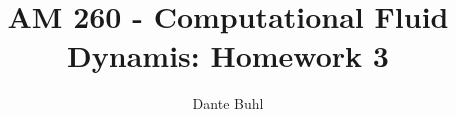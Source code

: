 \documentclass{article}
\begin{document}
\title{AM 260 - Computational Fluid Dynamis: Homework 3}
\author{Dante Buhl}


\newcommand{\wrms}{w_{\text{rms}}}
\newcommand{\bs}[1]{\boldsymbol{#1}}
\newcommand{\tb}[1]{\textbf{#1}}
\newcommand{\bmp}[1]{\begin{minipage}{#1\textwidth}}
\newcommand{\emp}{\end{minipage}}
\newcommand{\R}{\mathbb{R}}
\newcommand{\C}{\mathbb{C}}
\newcommand{\N}{\mathcal{N}}
\newcommand{\m}{\bs{\mu}_*}
\newcommand{\s}{\bs{\Sigma}_*}
\newcommand{\dt}{\Delta t}
\newcommand{\dx}{\Delta x}
\newcommand{\tr}[1]{\text{Tr}(#1)}
\newcommand{\Tr}[1]{\text{Tr}(#1)}
\newcommand{\Div}{\nabla \cdot}
\renewcommand{\div}{\nabla \cdot}
\newcommand{\Curl}{\nabla \times}
\newcommand{\Grad}{\nabla}
\newcommand{\grad}{\nabla}
\newcommand{\grads}{\nabla_s}
\newcommand{\gradf}{\nabla_f}
\newcommand{\xs}{x_s}
\newcommand{\x}{\bs{x}}
\newcommand{\xf}{x_f}
\newcommand{\ts}{t_s}
\newcommand{\tf}{t_f}
\newcommand{\pt}{\partial t}
\newcommand{\pz}{\partial z}
\newcommand{\uvec}{\bs{u}}
\newcommand{\bvec}{\bs{B}}
\newcommand{\nvec}{\hat{\bs{n}}}
\newcommand{\tu}{\tilde{\uvec}}
\newcommand{\B}{\bs{B}}
\newcommand{\A}{\bs{A}}
\newcommand{\jvec}{\bs{j}}
\newcommand{\F}{\bs{F}}
\newcommand{\T}{\tilde{T}}
\newcommand{\ez}{\bs{e}_z}
\newcommand{\ex}{\bs{e}_x}
\newcommand{\ey}{\bs{e}_y}
\newcommand{\eo}{\bs{e}_{\bs{\Omega}}}
\newcommand{\ppt}[1]{\frac{\partial #1}{\partial t}}
\newcommand{\pp}[2]{\frac{\partial #1}{\partial #2}}
\newcommand{\pptwo}[2]{\frac{\partial^2 #1}{\partial #2^2}}
\newcommand{\ddtwo}[2]{\frac{d^2 #1}{d #2^2}}
\newcommand{\DDt}[1]{\frac{D #1}{D t}}
\newcommand{\ppts}[1]{\frac{\partial #1}{\partial t_s}}
\newcommand{\pptf}[1]{\frac{\partial #1}{\partial t_f}}
\newcommand{\ppz}[1]{\frac{\partial #1}{\partial z}}
\newcommand{\ddz}[1]{\frac{d #1}{d z}}
\newcommand{\ppzetas}[1]{\frac{\partial^2 #1}{\partial \zeta^2}}
\newcommand{\ppzs}[1]{\frac{\partial #1}{\partial z_s}}
\newcommand{\ppzf}[1]{\frac{\partial #1}{\partial z_f}}
\newcommand{\ppx}[1]{\frac{\partial #1}{\partial x}}
\newcommand{\ddx}[1]{\frac{d #1}{d x}}
\newcommand{\ppxi}[1]{\frac{\partial #1}{\partial x_i}}
\newcommand{\ppxj}[1]{\frac{\partial #1}{\partial x_j}}
\newcommand{\ppy}[1]{\frac{\partial #1}{\partial y}}
\newcommand{\ppzeta}[1]{\frac{\partial #1}{\partial \zeta}}
\renewcommand{\k}{\bs{k}}
\newcommand{\real}[1]{\text{Re}\left[#1\right]}


\maketitle 
\setlength{\parindent}{0pt}
\end{document}

